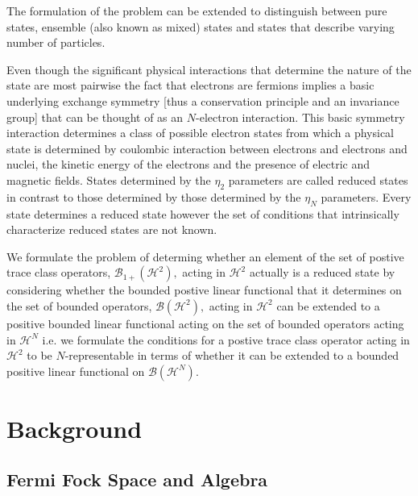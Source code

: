 \documentclass[aps,preprint]{revtex4}%
\begin{document}
The formulation of the problem can be extended to distinguish between pure
states, ensemble (also known as mixed) states and states that describe varying
number of particles.

Even though the significant physical interactions that determine the nature of
the state are most pairwise the fact that electrons are fermions implies a
basic underlying exchange symmetry [thus a conservation principle and an
invariance group] that can be thought of as an $N$-electron interaction. This
basic symmetry interaction determines a class of possible electron states from
which a physical state is determined by coulombic interaction between
electrons and electrons and nuclei, the kinetic energy of the electrons and
the presence of electric and magnetic fields. States determined by the
$\eta_{2}$ parameters are called reduced states in contrast to those
determined by those determined by the $\eta_{N}$ parameters. Every state
determines a reduced state however the set of conditions that intrinsically
characterize reduced states are not known.

We formulate the problem of determing whether an element of the set of postive
trace class operators, $\mathcal{B}_{1+}\left(  \mathcal{H}^{2}\right)  ,$
acting in $\mathcal{H}^{2}$ actually is a reduced state by considering whether
the bounded postive linear functional that it determines on the set of bounded
operators, $\mathcal{B}\left(  \mathcal{H}^{2}\right)  ,$ acting in
$\mathcal{H}^{2}$ can be extended to a positive bounded linear functional
acting on the set of bounded operators acting in $\mathcal{H}^{N}$ i.e. we
formulate the conditions for a postive trace class operator acting in
$\mathcal{H}^{2}$ to be $N$-representable in terms of whether it can be
extended to a bounded positive linear functional on $\mathcal{B}\left(
\mathcal{H}^{N}\right)  .$

\section{Background}

\subsection{Fermi Fock Space and Algebra}
\end{document}
